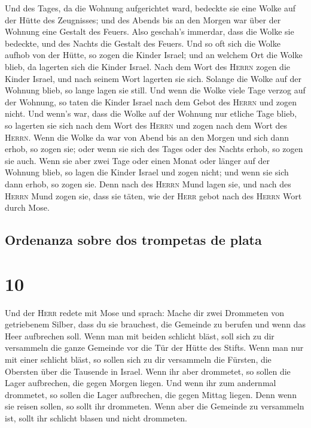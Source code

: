  Und des Tages, da die Wohnung aufgerichtet ward,
bedeckte sie eine Wolke auf der Hütte des Zeugnisses; und des Abends bis
an den Morgen war über der Wohnung eine Gestalt des Feuers.
 Also geschah's immerdar, dass die Wolke sie bedeckte,
und des Nachts die Gestalt des Feuers.  Und so oft sich
die Wolke aufhob von der Hütte, so zogen die Kinder Israel; und an
welchem Ort die Wolke blieb, da lagerten sich die Kinder Israel.
 Nach dem Wort des \textsc{Herrn} zogen die Kinder
Israel, und nach seinem Wort lagerten sie sich. Solange die Wolke auf
der Wohnung blieb, so lange lagen sie still.  Und wenn
die Wolke viele Tage verzog auf der Wohnung, so taten die Kinder Israel
nach dem Gebot des \textsc{Herrn} und zogen nicht.  Und
wenn's war, dass die Wolke auf der Wohnung nur etliche Tage blieb, so
lagerten sie sich nach dem Wort des \textsc{Herrn} und zogen nach dem
Wort des \textsc{Herrn}.  Wenn die Wolke da war von Abend
bis an den Morgen und sich dann erhob, so zogen sie; oder wenn sie sich
des Tages oder des Nachts erhob, so zogen sie auch.  Wenn
sie aber zwei Tage oder einen Monat oder länger auf der Wohnung blieb,
so lagen die Kinder Israel und zogen nicht; und wenn sie sich dann
erhob, so zogen sie.  Denn nach des \textsc{Herrn} Mund
lagen sie, und nach des \textsc{Herrn} Mund zogen sie, dass sie täten,
wie der \textsc{Herr} gebot nach des \textsc{Herrn} Wort durch Mose.

\hypertarget{ordenanza-sobre-dos-trompetas-de-plata}{%
\subsection{Ordenanza sobre dos trompetas de
plata}\label{ordenanza-sobre-dos-trompetas-de-plata}}

\hypertarget{section-9}{%
\section{10}\label{section-9}}

 Und der \textsc{Herr} redete mit Mose und sprach:
 Mache dir zwei Drommeten von getriebenem Silber, dass du
sie brauchest, die Gemeinde zu berufen und wenn das Heer aufbrechen
soll.  Wenn man mit beiden schlicht bläst, soll sich zu
dir versammeln die ganze Gemeinde vor die Tür der Hütte des Stifts.
 Wenn man nur mit einer schlicht bläst, so sollen sich zu
dir versammeln die Fürsten, die Obersten über die Tausende in Israel.
 Wenn ihr aber drommetet, so sollen die Lager aufbrechen,
die gegen Morgen liegen.  Und wenn ihr zum andernmal
drommetet, so sollen die Lager aufbrechen, die gegen Mittag liegen. Denn
wenn sie reisen sollen, so sollt ihr drommeten.  Wenn aber
die Gemeinde zu versammeln ist, sollt ihr schlicht blasen und nicht
drommeten.

